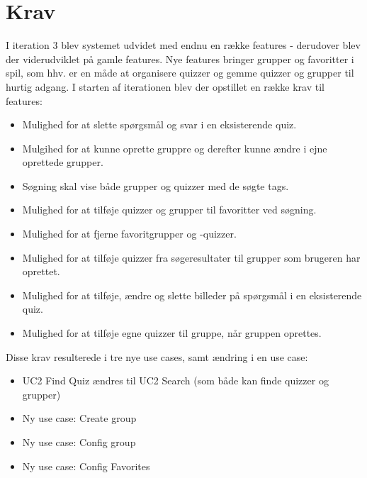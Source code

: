 \section{Krav}

I iteration 3 blev systemet udvidet med endnu en række features - derudover blev der viderudviklet på gamle features. Nye features bringer grupper og favoritter i spil, som hhv. er en måde at organisere quizzer og gemme quizzer og grupper til hurtig adgang.
I starten af iterationen blev der opstillet en række krav til features:

\begin{itemize}
	\item Mulighed for at slette spørgsmål og svar i en eksisterende quiz.
	\item Mulgihed for at kunne oprette gruppre og derefter kunne ændre i ejne oprettede grupper.
	\item Søgning skal vise både grupper og quizzer med de søgte tags.
	\item Mulighed for at tilføje quizzer og grupper til favoritter ved søgning.
	\item Mulighed for at fjerne favoritgrupper og -quizzer.
	\item Mulighed for at tilføje quizzer fra søgeresultater til grupper som brugeren har oprettet.
	\item Mulighed for at tilføje, ændre og slette billeder på spørgsmål i en eksisterende quiz.
	\item Mulighed for at tilføje egne quizzer til gruppe, når gruppen oprettes.
\end{itemize}

Disse krav resulterede i tre nye use cases, samt ændring i en use case:
\begin{itemize}
	\item UC2 Find Quiz ændres til UC2 Search (som både kan finde quizzer og grupper)
	\item Ny use case: Create group
	\item Ny use case: Config group
	\item Ny use case: Config Favorites
\end{itemize}